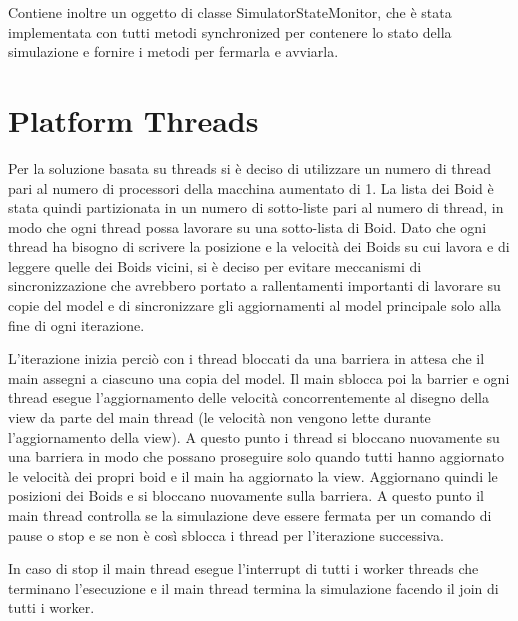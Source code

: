 \documentclass[11pt,notitlepage]{article}
\begin{document}
Contiene inoltre un oggetto di classe \textsf{SimulatorStateMonitor}, che è stata implementata con tutti metodi \textsf{synchronized} per contenere lo stato della simulazione
e fornire i metodi per fermarla e avviarla.

\section{Platform Threads}
Per la soluzione basata su threads si è deciso di utilizzare un numero di thread pari al numero di processori della macchina aumentato di 1. La lista dei Boid è stata
quindi partizionata in un numero di sotto-liste pari al numero di thread, in modo che ogni thread possa lavorare su una sotto-lista di Boid.
Dato che ogni thread ha bisogno di scrivere la posizione e la velocità dei Boids su cui lavora e di leggere quelle dei Boids vicini, si è deciso per evitare meccanismi di 
sincronizzazione che avrebbero portato a rallentamenti importanti di lavorare su copie del model e di sincronizzare gli aggiornamenti al model principale solo alla fine di ogni
iterazione.

L'iterazione inizia perciò con i thread bloccati da una barriera in attesa che il main assegni a ciascuno una copia del model. Il main sblocca poi la barrier e ogni
thread esegue l'aggiornamento delle velocità concorrentemente al disegno della view da parte del main thread (le velocità non vengono lette durante l'aggiornamento della view).
A questo punto i thread si bloccano nuovamente su una barriera in modo che possano proseguire solo quando tutti hanno aggiornato le velocità dei propri boid e il main ha aggiornato
la view. Aggiornano quindi le posizioni dei Boids e si bloccano nuovamente sulla barriera. A questo punto il main thread controlla se la simulazione deve essere fermata per un comando
di pause o stop e se non è così sblocca i thread per l'iterazione successiva.

In caso di stop il main thread esegue l'interrupt di tutti i worker threads che terminano l'esecuzione e il main thread termina la simulazione facendo il join di tutti i worker.
\end{document}
